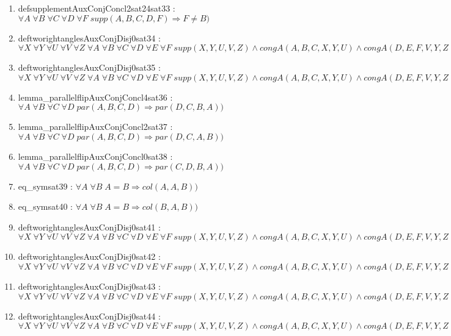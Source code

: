 \documentclass{article}
\begin{document}
\begin{enumerate}
\item defsupplementAuxConjConcl2sat24sat33 : $\forall A\;\forall B\;\forall C\;\forall D\;\forall F\;supp(A, B, C, D, F) \Rightarrow F \neq B)$
\item deftworightanglesAuxConjDisj0sat34 : $\forall X\;\forall Y\;\forall U\;\forall V\;\forall Z\;\forall A\;\forall B\;\forall C\;\forall D\;\forall E\;\forall F\;supp(X, Y, U, V, Z)\wedge congA(A, B, C, X, Y, U)\wedge congA(D, E, F, V, Y, Z) \Rightarrow betS(X, Y, Z))$
\item deftworightanglesAuxConjDisj0sat35 : $\forall X\;\forall Y\;\forall U\;\forall V\;\forall Z\;\forall A\;\forall B\;\forall C\;\forall D\;\forall E\;\forall F\;supp(X, Y, U, V, Z)\wedge congA(A, B, C, X, Y, U)\wedge congA(D, E, F, V, Y, Z) \Rightarrow out(Y, U, V))$
\item lemma\_parallelflipAuxConjConcl4sat36 : $\forall A\;\forall B\;\forall C\;\forall D\;par(A, B, C, D) \Rightarrow par(D, C, B, A))$
\item lemma\_parallelflipAuxConjConcl2sat37 : $\forall A\;\forall B\;\forall C\;\forall D\;par(A, B, C, D) \Rightarrow par(D, C, A, B))$
\item lemma\_parallelflipAuxConjConcl0sat38 : $\forall A\;\forall B\;\forall C\;\forall D\;par(A, B, C, D) \Rightarrow par(C, D, B, A))$
\item eq\_symsat39 : $\forall A\;\forall B\;A = B \Rightarrow col(A, A, B))$
\item eq\_symsat40 : $\forall A\;\forall B\;A = B \Rightarrow col(B, A, B))$
\item deftworightanglesAuxConjDisj0sat41 : $\forall X\;\forall Y\;\forall U\;\forall V\;\forall Z\;\forall A\;\forall B\;\forall C\;\forall D\;\forall E\;\forall F\;supp(X, Y, U, V, Z)\wedge congA(A, B, C, X, Y, U)\wedge congA(D, E, F, V, Y, Z) \Rightarrow col(Y, X, Z))$
\item deftworightanglesAuxConjDisj0sat42 : $\forall X\;\forall Y\;\forall U\;\forall V\;\forall Z\;\forall A\;\forall B\;\forall C\;\forall D\;\forall E\;\forall F\;supp(X, Y, U, V, Z)\wedge congA(A, B, C, X, Y, U)\wedge congA(D, E, F, V, Y, Z) \Rightarrow col(X, Y, Z))$
\item deftworightanglesAuxConjDisj0sat43 : $\forall X\;\forall Y\;\forall U\;\forall V\;\forall Z\;\forall A\;\forall B\;\forall C\;\forall D\;\forall E\;\forall F\;supp(X, Y, U, V, Z)\wedge congA(A, B, C, X, Y, U)\wedge congA(D, E, F, V, Y, Z) \Rightarrow col(X, Z, Y))$
\item deftworightanglesAuxConjDisj0sat44 : $\forall X\;\forall Y\;\forall U\;\forall V\;\forall Z\;\forall A\;\forall B\;\forall C\;\forall D\;\forall E\;\forall F\;supp(X, Y, U, V, Z)\wedge congA(A, B, C, X, Y, U)\wedge congA(D, E, F, V, Y, Z) \Rightarrow X \neq Z)$

\end{enumerate}
\end{document}
